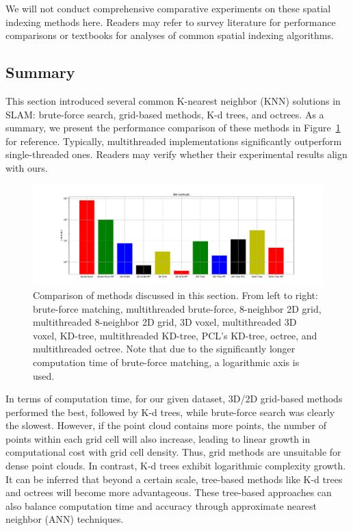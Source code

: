 We will not conduct comprehensive comparative experiments on these spatial indexing methods here. Readers may refer to survey literature \cite{Mahapatra2015, Bhatia2010} for performance comparisons or textbooks \cite{李航2012} for analyses of common spatial indexing algorithms.

\subsection{Summary}
This section introduced several common K-nearest neighbor (KNN) solutions in SLAM: brute-force search, grid-based methods, K-d trees, and octrees. As a summary, we present the performance comparison of these methods in Figure~\ref{fig:nn-compare} for reference. Typically, multithreaded implementations significantly outperform single-threaded ones. Readers may verify whether their experimental results align with ours.

\begin{figure}[!htp]
	\centering
	\includegraphics[width=1.0\textwidth]{resources/basic-point-cloud/nn-compare.pdf}
	\caption{Comparison of methods discussed in this section. From left to right: brute-force matching, multithreaded brute-force, 8-neighbor 2D grid, multithreaded 8-neighbor 2D grid, 3D voxel, multithreaded 3D voxel, KD-tree, multithreaded KD-tree, PCL's KD-tree, octree, and multithreaded octree. Note that due to the significantly longer computation time of brute-force matching, a logarithmic axis is used.}
	\label{fig:nn-compare}
\end{figure}

In terms of computation time, for our given dataset, 3D/2D grid-based methods performed the best, followed by K-d trees, while brute-force search was clearly the slowest. However, if the point cloud contains more points, the number of points within each grid cell will also increase, leading to linear growth in computational cost with grid cell density. Thus, grid methods are unsuitable for dense point clouds. In contrast, K-d trees exhibit logarithmic complexity growth. It can be inferred that beyond a certain scale, tree-based methods like K-d trees and octrees will become more advantageous. These tree-based approaches can also balance computation time and accuracy through approximate nearest neighbor (ANN) techniques.

